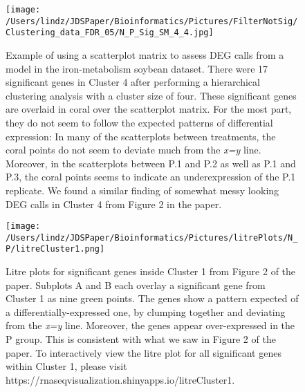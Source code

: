 \documentclass{article}
\begin{document}
\begin{figure}[!p]
\centerline{\texttt{[image: /Users/lindz/JDSPaper/Bioinformatics/Pictures/FilterNotSig/Clustering\_data\_FDR\_05/N\_P\_Sig\_SM\_4\_4.jpg]}}
\caption{Example of using a scatterplot matrix to assess DEG calls from a model in the iron-metabolism soybean dataset. There were 17 significant genes in Cluster 4 after performing a hierarchical clustering analysis with a cluster size of four. These significant genes are overlaid in coral over the scatterplot matrix. For the most part, they do not seem to follow the expected patterns of differential expression: In many of the scatterplots between treatments, the coral points do not seem to deviate much from the \textit{x=y} line. Moreover, in the scatterplots between P.1 and P.2 as well as P.1 and P.3, the coral points seems to indicate an underexpression of the P.1 replicate. We found a similar finding of somewhat messy looking DEG calls in Cluster 4 from Figure 2 in the paper. 
\label{suppSMCluster4}}
\end{figure}  
  
\begin{figure}[!p]
\centerline{\texttt{[image: /Users/lindz/JDSPaper/Bioinformatics/Pictures/litrePlots/N\_P/litreCluster1.png]}}
\caption{Litre plots for significant genes inside Cluster 1 from Figure 2 of the paper. Subplots A and B each overlay a significant gene from Cluster 1 as nine green points. The genes show a pattern expected of a differentially-expressed one, by clumping together and deviating from the \textit{x=y} line. Moreover, the genes appear over-expressed in the P group. This is consistent with what we saw in Figure 2 of the paper. To interactively view the litre plot for all significant genes within Cluster 1, please visit https://rnaseqvisualization.shinyapps.io/litreCluster1.
\label{litreCluster1}}
\end{figure}   
\end{document}
